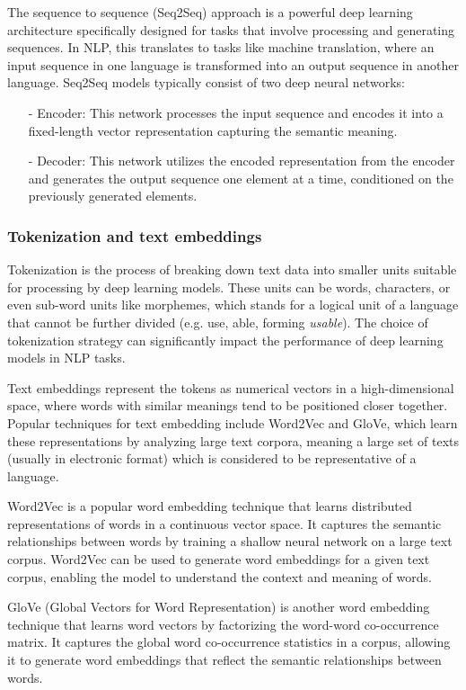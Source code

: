 \documentclass[12pt]{article}
\begin{document}
The sequence to sequence (Seq2Seq) approach is a powerful deep learning architecture specifically designed for tasks that involve processing and generating sequences. In NLP, this translates to tasks like machine translation, where an input sequence in one language is transformed into an output sequence in another language. Seq2Seq models typically consist of two deep neural networks:
\begin{enumerate}
    \item[-] Encoder: This network processes the input sequence and encodes it into a fixed-length vector representation capturing the semantic meaning.
    \item[-] Decoder: This network utilizes the encoded representation from the encoder and generates the output sequence one element at a time, conditioned on the previously generated elements.
\end{enumerate}

\subsubsection{Tokenization and text embeddings}

Tokenization is the process of breaking down text data into smaller units suitable for processing by deep learning models. These units can be words, characters, or even sub-word units like morphemes, which stands for a logical unit of a language that cannot be further divided (e.g. use, able, forming \textit{usable}). The choice of tokenization strategy can significantly impact the performance of deep learning models in NLP tasks.

Text embeddings represent the tokens as numerical vectors in a high-dimensional space, where words with similar meanings tend to be positioned closer together. Popular techniques for text embedding include Word2Vec and GloVe, which learn these representations by analyzing large text corpora, meaning a large set of texts (usually in electronic format) which is considered to be representative of a language.

Word2Vec is a popular word embedding technique that learns distributed representations of words in a continuous vector space. It captures the semantic relationships between words by training a shallow neural network on a large text corpus. Word2Vec can be used to generate word embeddings for a given text corpus, enabling the model to understand the context and meaning of words.

GloVe (Global Vectors for Word Representation) is another word embedding technique that learns word vectors by factorizing the word-word co-occurrence matrix. It captures the global word co-occurrence statistics in a corpus, allowing it to generate word embeddings that reflect the semantic relationships between words.
\end{document}
